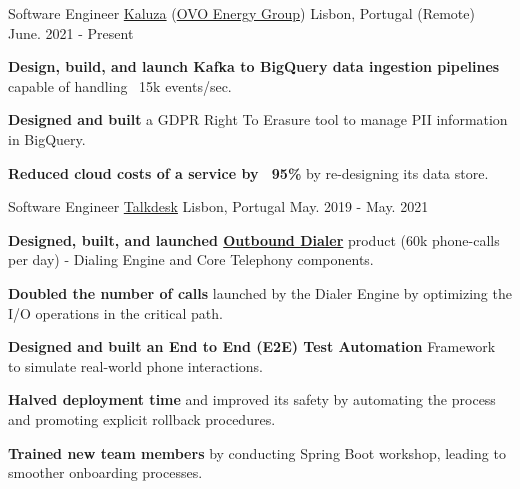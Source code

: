 
\begin{cventries}
  \vspace{-2mm}
  \cventry
    {Software Engineer}
    {\href{https://www.kaluza.com/}{Kaluza} (\href{https://www.ovoenergy.com/}{OVO Energy Group})}
    {Lisbon, Portugal (Remote)}
    {June. 2021 - Present}
    {
      \begin{cvitems}
        \item \textbf{Design, build, and launch Kafka to BigQuery data ingestion pipelines} capable of handling ~15k events/sec.
        \item \textbf{Designed and built} a GDPR Right To Erasure tool to manage PII information in BigQuery.
        \item \textbf{Reduced cloud costs of a service by ~95\%} by re-designing its data store.
      \end{cvitems}
      \vspace{4mm}
    }

  \cventry
    {Software Engineer}
    {\href{https://www.talkdesk.com/}{Talkdesk}}
    {Lisbon, Portugal}
    {May. 2019 - May. 2021}
    {
      \begin{cvitems}
        \item \textbf{Designed, built, and launched \href{https://www.youtube.com/watch?v=W9yJ6gi1ggA}{Outbound Dialer}} product (60k phone-calls per day) - Dialing Engine and Core Telephony components.
        \item \textbf{Doubled the number of calls} launched by the Dialer Engine by optimizing the I/O operations in the critical path.
        \item \textbf{Designed and built an End to End (E2E) Test Automation} Framework to simulate real-world phone interactions.
        \item \textbf{Halved deployment time} and improved its safety by automating the process and promoting explicit rollback procedures.
        \item \textbf{Trained new team members} by conducting Spring Boot workshop, leading to smoother onboarding processes.
      \end{cvitems}
      \vspace{4mm}
    }
    

\end{cventries}
